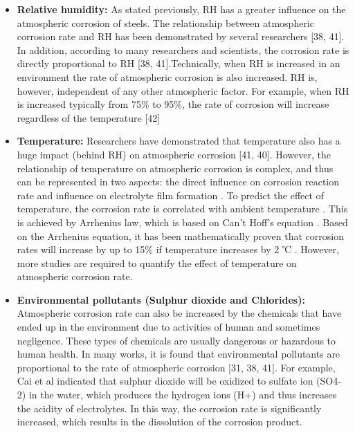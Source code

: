 \documentclass[12pt]{report}
\begin{document}
\begin{itemize}
    \item \textbf{Relative humidity:} As stated previously, RH has a greater influence on the atmospheric corrosion of steels. The relationship between atmospheric corrosion rate and RH has been demonstrated by several researchers [38, 41]. In addition, according to many researchers and scientists, the corrosion rate is directly proportional to RH [38, 41].Technically, when RH is increased in an environment the rate of atmospheric corrosion is also increased. RH is, however, independent of any other atmospheric factor. For example, when RH is increased typically from 75\% to 95\%, the rate of corrosion will increase regardless of the temperature [42]
    
    \item \textbf{Temperature:}  Researchers have demonstrated that temperature also has a huge impact (behind RH) on atmospheric corrosion [41, 40]. However, the relationship of temperature on atmospheric corrosion is complex, and thus can be represented in two aspects: the direct influence on corrosion reaction rate and influence on electrolyte film formation \cite{cai2018influence}. To predict the effect of temperature, the corrosion rate is correlated with ambient temperature \cite{pei2021understanding}.  This is achieved by Arrhenius law, which is based on Can't Hoff’s equation \cite{cai2018influence}. Based on the Arrhenius equation, it has been mathematically proven that corrosion rates will increase by up to 15\% if temperature increases by 2 ℃ \cite{mcarthur2004engineering}. However, more studies are required to quantify the effect of temperature on atmospheric corrosion rate.  
    
    \item \textbf{Environmental pollutants (Sulphur dioxide and Chlorides):} Atmospheric corrosion rate can also be increased by the chemicals that have ended up in the environment due to activities of human and sometimes negligence. These types of chemicals are usually dangerous or hazardous to human health. In many works, it is found that environmental pollutants are proportional to the rate of atmospheric corrosion [31, 38, 41]. For example, Cai et al \cite{cai2018influence} indicated that sulphur dioxide will be oxidized to sulfate ion (SO4-2) in the water, which produces the hydrogen ions (H+) and thus increases the acidity of electrolytes. In this way, the corrosion rate is significantly increased, which results in the dissolution of the corrosion product.
\end{itemize}
    
\end{document}
